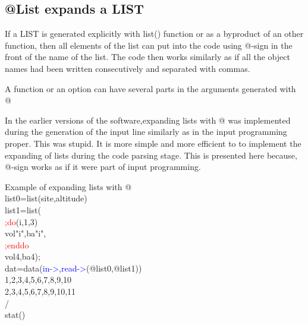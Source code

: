 \subsection{@List expands a LIST}
\label{expand}
If a LIST is generated explicitly with \textcolor{VioletRed}{list}() function or as a byproduct of an other function,
then all elements of the list can put into the code using @-sign in the front of the name of the list.
The code then works similarly as if all the object names had been written consecutively and separated
with commas.
\begin{note}
A function or an option can have several parts in the arguments generated with @
\end{note}
\begin{note}
In the earlier versions of the software,expanding lists with @ was implemented during the generation of
the input line similarly as in the input programming proper. This was stupid. It is more simple and more efficient to
to implement the expanding of lists during the code parsing stage. This is presented here because, @-sign works
as if it were part of input programming.
\end{note}
\begin{example}[expandex]Example of expanding lists with @\\
\label{expandex}
list0=\textcolor{VioletRed}{list}(site,altitude)\\
list1=\textcolor{VioletRed}{list}(\\
\textcolor{Red}{;do}(i,1,3)\\
vol"i",ba"i",\\
\textcolor{Red}{;enddo}\\
vol4,ba4);\\
dat=\textcolor{VioletRed}{data}(\textcolor{blue}{in->},\textcolor{blue}{read->}(@list0,@list1))\\
1,2,3,4,5,6,7,8,9,10\\
2,3,4,5,6,7,8,9,10,11\\
/\\
\textcolor{VioletRed}{stat}()
\end{example}

